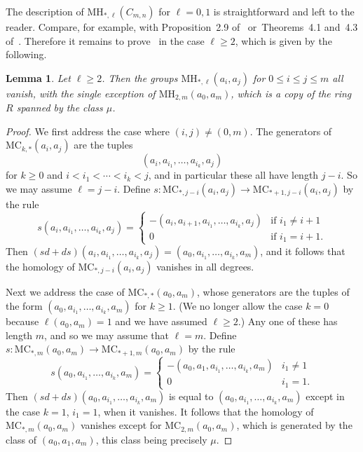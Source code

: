 \documentclass[a4paper, 11 pt, oneside, reqno]{amsart}
\newtheorem{lemma}{Lemma}
\numberwithin{lemma}{section}
\theoremstyle{definition}
\newcommand{\MC}{\mathrm{MC}}
\newcommand{\MH}{\mathrm{MH}}
\begin{document}
The description of $\MH_{\ast,\ell}(C_{m,n})$ for $\ell=0,1$
is straightforward and left to the reader. 
Compare, for example, with Proposition~2.9 of~\cite{HepworthWillerton2017}
or~Theorems~4.1 and~4.3 of~\cite{LeinsterShulman}.
Therefore it remains to prove~ 
in the case $\ell\geq 2$, which is given by the following.

\begin{lemma}
    Let $\ell\geq 2$.
    Then the groups 
    $\MH_{\ast,\ell}(a_i,a_j)$
    for $0\leq i\leq j\leq m$ 
    all vanish, with the single exception of 
    $\MH_{2,m}(a_0,a_m)$,
    which is a copy of the ring $R$ spanned by the
    class $\mu$.
\end{lemma}

\begin{proof}
    We first address the case where $(i,j)\neq (0,m)$.
    The generators of 
    $\MC_{k,\ast}(a_i,a_j)$ are the tuples
    \[
        (a_i,a_{i_1},\ldots,a_{i_k},a_j)
    \]
    for $k\geq 0$ and $i<i_1<\cdots<i_k<j$,
    and in particular these all have length $j-i$.
    So we may assume $\ell=j-i$.
    Define 
    $s\colon\MC_{\ast,j-i}(a_i,a_j)
    \to \MC_{\ast+1,j-i}(a_i,a_j)$
    by the rule
    \[
        s(a_i,a_{i_1},\ldots,a_{i_k},a_j)
        =\begin{cases}
            -(a_i,a_{i+1},a_{i_1},\ldots,a_{i_k},a_j)
            &
            \text{if }i_1\neq i+1 
            \\
            0
            &
            \text{if }i_1=i+1.
        \end{cases}
    \]
    Then $(sd+ds)(a_i,a_{i_1},\ldots,a_{i_k},a_j)=
    (a_0,a_{i_1},\ldots,a_{i_k},a_m)$,
    and it follows that the homology of 
    $\MC_{\ast,j-i}(a_i,a_j)$ vanishes in all degrees.

    Next we address the case of  $\MC_{\ast,\ast}(a_0,a_m)$,
    whose generators are the tuples of the form
    $(a_0,a_{i_1},\ldots,a_{i_k},a_m)$ for $k\geq 1$.
    (We no longer allow the case $k=0$ because
    $\ell(a_0,a_m)=1$ and we have assumed $\ell\geq 2$.)
    Any one of these has length $m$, and so we may assume that
    $\ell=m$.
    Define 
    $s\colon\MC_{\ast,m}(a_0,a_m)
    \to \MC_{\ast+1,m}(a_0,a_m)$
    by the rule
    \[
        s(a_0,a_{i_1},\ldots,a_{i_k},a_m)
        =\begin{cases}
            -(a_0,a_1,a_{i_1},\ldots,a_{i_k},a_m)
            &
            i_1\neq 1
            \\
            0
            &
            i_1=1.
        \end{cases}
    \]
    Then $(sd+ds)(a_0,a_{i_1},\ldots,a_{i_k},a_m)$
    is equal to $(a_0,a_{i_1},\ldots,a_{i_k},a_m)$ 
    except in the case $k=1$, $i_1=1$, when it vanishes.
    It follows that the homology of $\MC_{\ast,m}(a_0,a_m)$
    vanishes except for $\MC_{2,m}(a_0,a_m)$,
    which is generated by the class of $(a_0,a_1,a_m)$,
    this class being precisely $\mu$.
\end{proof}
\end{document}
